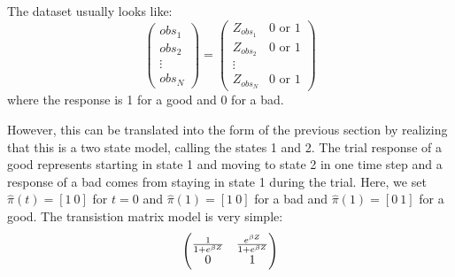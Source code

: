 \documentclass[10pt]{article}
\begin{document}
The dataset usually looks like:
\begin{equation*}
\begin{pmatrix}
obs_1 \\
obs_2 \\
\vdots \\
obs_N
\end{pmatrix}
=
\begin{pmatrix}
Z_{obs_1} & 0 \text{ or } 1 \\
Z_{obs_2} & 0 \text{ or } 1 \\
\vdots \\
Z_{obs_N} & 0 \text{ or } 1 
\end{pmatrix}
\end{equation*}
where the response is 1 for a good and 0 for a bad.

However, this can be translated into the form of the previous section by realizing that this is a two state model, calling the states 1 and 2.
The trial response of a good represents starting in state 1 and moving to state 2 in one time step and a response of a bad comes from staying 
in state 1 during the trial. Here, we set $\widehat{\pi}(t)=[1 ~ 0]$ for $t=0$ and $\widehat{\pi}(1)=[1 ~ 0]$ for a bad and 
$\widehat{\pi}(1)=[0 ~ 1]$ for a good. The transistion matrix model is very simple:
\begin{equation*}
\begin{pmatrix}
{1\over 1+e^{\beta Z}} & {e^{\beta Z} \over 1+e^{\beta Z}} \\
0 & 1
\end{pmatrix}
\end{equation*}
\end{document}
